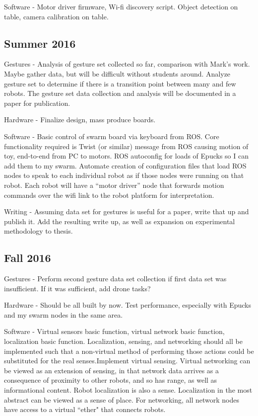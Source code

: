 \documentclass[]{article}
\begin{document}
Software - Motor driver firmware, Wi-fi discovery script. Object detection on table, camera calibration on table. 

\subsection{Summer 2016}

Gestures - Analysis of gesture set collected so far, comparison with Mark's work. 
Maybe gather data, but will be difficult without students around.
Analyze gesture set to determine if there is a transition point between many and few robots. 
The gesture set data collection and analysis will be documented in a paper for publication. 

Hardware - Finalize design, mass produce boards. 

Software - Basic control of swarm board via keyboard from ROS. 
Core functionality required is Twist (or similar) message from ROS causing motion of toy, end-to-end from PC to motors. 
ROS autoconfig for loads of Epucks so I can add them to my swarm. 
Automate creation of configuration files that load ROS nodes to speak to each individual robot as if those nodes were running on that robot. 
Each robot will have a ``motor driver'' node that forwards motion commands over the wifi link to the robot platform for interpretation. 


Writing - Assuming data set for gestures is useful for a paper, write that up and publish it. Add the resulting write up, as well as expansion on experimental methodology to thesis. 

\subsection{Fall 2016}

Gestures - Perform second gesture data set collection if first data set was insufficient. If it was sufficient, add drone tasks?

Hardware - Should be all built by now. Test performance, especially with Epucks and my swarm nodes in the same area. 

Software - Virtual sensors basic function, virtual network basic function, localization basic function. Localization, sensing, and networking should all be implemented such that a non-virtual method of performing those actions could be substituted for the real senses.Implement virtual sensing. 
Virtual networking can be viewed as an extension of sensing, in that network data arrives as a consequence of proximity to other robots, and so has range, as well as informational content. 
Robot localization is also a sense. 
Localization in the most abstract can be viewed as a sense of place. 
For networking, all network nodes have access to a virtual ``ether" that connects robots. 
\end{document}
